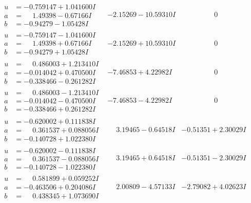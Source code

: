 \documentclass[1p]{elsarticle_modified}
\theoremstyle{definition}
\begin{document}
$$\begin{array}{c|c|c}
\begin{aligned}
u &= -0.759147 + 1.041600 I \\
a &= \phantom{-}1.49398 - 0.67166 I \\
b &= -0.94279 - 1.05428 I\end{aligned}
 & -2.15269 - 10.59310 I & \phantom{-0.000000 } 0 \\ \hline\begin{aligned}
u &= -0.759147 - 1.041600 I \\
a &= \phantom{-}1.49398 + 0.67166 I \\
b &= -0.94279 + 1.05428 I\end{aligned}
 & -2.15269 + 10.59310 I & \phantom{-0.000000 } 0 \\ \hline\begin{aligned}
u &= \phantom{-}0.486003 + 1.213410 I \\
a &= -0.014042 + 0.470500 I \\
b &= -0.338466 - 0.261282 I\end{aligned}
 & -7.46853 + 4.22982 I & \phantom{-0.000000 } 0 \\ \hline\begin{aligned}
u &= \phantom{-}0.486003 - 1.213410 I \\
a &= -0.014042 - 0.470500 I \\
b &= -0.338466 + 0.261282 I\end{aligned}
 & -7.46853 - 4.22982 I & \phantom{-0.000000 } 0 \\ \hline\begin{aligned}
u &= -0.620002 + 0.111838 I \\
a &= \phantom{-}0.361537 + 0.088056 I \\
b &= -0.140728 + 1.022380 I\end{aligned}
 & \phantom{-}3.19465 - 0.64518 I & -0.51351 + 2.30029 I \\ \hline\begin{aligned}
u &= -0.620002 - 0.111838 I \\
a &= \phantom{-}0.361537 - 0.088056 I \\
b &= -0.140728 - 1.022380 I\end{aligned}
 & \phantom{-}3.19465 + 0.64518 I & -0.51351 - 2.30029 I \\ \hline\begin{aligned}
u &= \phantom{-}0.581899 + 0.059252 I \\
a &= -0.463506 + 0.204086 I \\
b &= \phantom{-}0.438345 + 1.073690 I\end{aligned}
 & \phantom{-}2.00809 - 4.57133 I & -2.79082 + 4.02623 I \\ \hline\begin{aligned}

\end{aligned}
\end{array}$$
\end{document}

